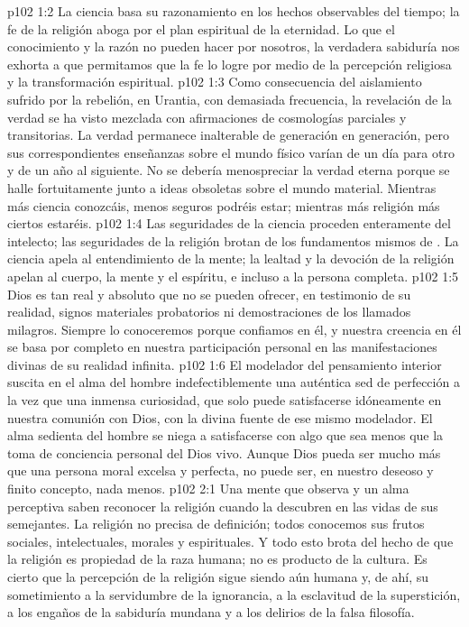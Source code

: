 \vs p102 1:2 La ciencia basa su razonamiento en los hechos observables del tiempo; la fe de la religión aboga por el plan espiritual de la eternidad. Lo que el conocimiento y la razón no pueden hacer por nosotros, la verdadera sabiduría nos exhorta a que permitamos que la fe lo logre por medio de la percepción religiosa y la transformación espiritual.
\vs p102 1:3 Como consecuencia del aislamiento sufrido por la rebelión, en Urantia, con demasiada frecuencia, la revelación de la verdad se ha visto mezclada con afirmaciones de cosmologías parciales y transitorias. La verdad permanece inalterable de generación en generación, pero sus correspondientes enseñanzas sobre el mundo físico varían de un día para otro y de un año al siguiente. No se debería menospreciar la verdad eterna porque se halle fortuitamente junto a ideas obsoletas sobre el mundo material. Mientras más ciencia conozcáis, menos seguros podréis estar; mientras más religión  más ciertos estaréis.
\vs p102 1:4 Las seguridades de la ciencia proceden enteramente del intelecto; las seguridades de la religión brotan de los fundamentos mismos de . La ciencia apela al entendimiento de la mente; la lealtad y la devoción de la religión apelan al cuerpo, la mente y el espíritu, e incluso a la persona completa.
\vs p102 1:5 \pc Dios es tan real y absoluto que no se pueden ofrecer, en testimonio de su realidad, signos materiales probatorios ni demostraciones de los llamados milagros. Siempre lo conoceremos porque confiamos en él, y nuestra creencia en él se basa por completo en nuestra participación personal en las manifestaciones divinas de su realidad infinita.
\vs p102 1:6 \pc El modelador del pensamiento interior suscita en el alma del hombre indefectiblemente una auténtica sed de perfección a la vez que una inmensa curiosidad, que solo puede satisfacerse idóneamente en nuestra comunión con Dios, con la divina fuente de ese mismo modelador. El alma sedienta del hombre se niega a satisfacerse con algo que sea menos que la toma de conciencia personal del Dios vivo. Aunque Dios pueda ser mucho más que una persona moral excelsa y perfecta, no puede ser, en nuestro deseoso y finito concepto, nada menos.
\vs p102 2:1 Una mente que observa y un alma perceptiva saben reconocer la religión cuando la descubren en las vidas de sus semejantes. La religión no precisa de definición; todos conocemos sus frutos sociales, intelectuales, morales y espirituales. Y todo esto brota del hecho de que la religión es propiedad de la raza humana; no es producto de la cultura. Es cierto que la percepción de la religión sigue siendo aún humana y, de ahí, su sometimiento a la servidumbre de la ignorancia, a la esclavitud de la superstición, a los engaños de la sabiduría mundana y a los delirios de la falsa filosofía.
